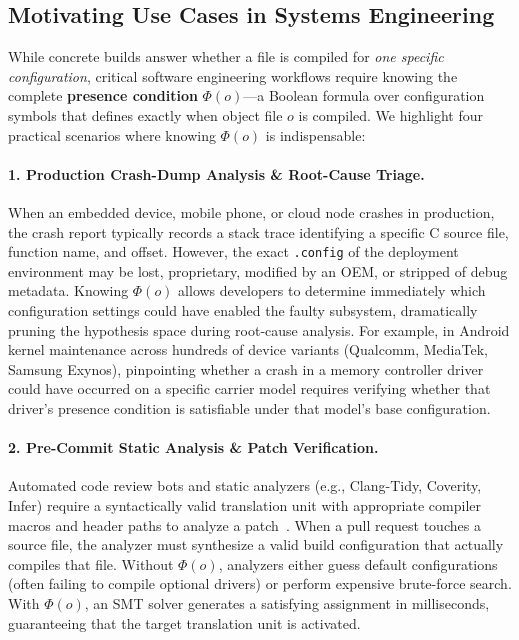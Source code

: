 \documentclass[acmsmall,screen,review]{acmart}
\begin{document}
\subsection{Motivating Use Cases in Systems Engineering}
\label{sec:intro:use-cases}

While concrete builds answer whether a file is compiled for \emph{one specific configuration}, critical software engineering workflows require knowing the complete \textbf{presence condition} $\Phi(o)$---a Boolean formula over configuration symbols that defines exactly when object file $o$ is compiled. We highlight four practical scenarios where knowing $\Phi(o)$ is indispensable:

\paragraph{1. Production Crash-Dump Analysis \& Root-Cause Triage.}
When an embedded device, mobile phone, or cloud node crashes in production, the crash report typically records a stack trace identifying a specific C source file, function name, and offset. However, the exact \texttt{.config} of the deployment environment may be lost, proprietary, modified by an OEM, or stripped of debug metadata. Knowing $\Phi(o)$ allows developers to determine immediately which configuration settings could have enabled the faulty subsystem, dramatically pruning the hypothesis space during root-cause analysis. For example, in Android kernel maintenance across hundreds of device variants (Qualcomm, MediaTek, Samsung Exynos), pinpointing whether a crash in a memory controller driver could have occurred on a specific carrier model requires verifying whether that driver's presence condition is satisfiable under that model's base configuration.

\paragraph{2. Pre-Commit Static Analysis \& Patch Verification.}
Automated code review bots and static analyzers (e.g., Clang-Tidy, Coverity, Infer) require a syntactically valid translation unit with appropriate compiler macros and header paths to analyze a patch~\cite{melo2016variability,liebig2011variability}. When a pull request touches a source file, the analyzer must synthesize a valid build configuration that actually compiles that file. Without $\Phi(o)$, analyzers either guess default configurations (often failing to compile optional drivers) or perform expensive brute-force search. With $\Phi(o)$, an SMT solver generates a satisfying assignment in milliseconds, guaranteeing that the target translation unit is activated.
\end{document}
